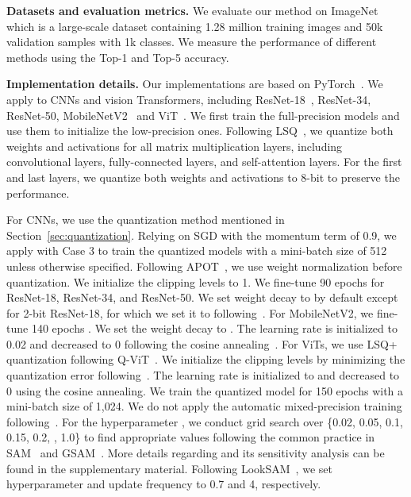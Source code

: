 \noindent\textbf{Datasets and evaluation metrics.} We evaluate our method on  ImageNet~\cite{deng2009imagenet} which is a large-scale dataset containing 1.28 million training images and 50k validation samples with 1k classes.
We measure the performance of different methods using the Top-1 and Top-5 accuracy. 

\noindent\textbf{Implementation details.}
Our implementations are based on PyTorch~\cite{paszke2019pytorch}. We apply \methodshortname to CNNs and vision Transformers, including ResNet-18~\cite{he2016deep}, ResNet-34, ResNet-50,  MobileNetV2~\cite{sandler2018inverted} and ViT~\cite{dosovitskiy2020image}. 
We first train the full-precision models and use them to initialize the low-precision ones. Following LSQ~\cite{Esser2020LEARNED}, we quantize both weights and activations for all matrix multiplication layers, including convolutional layers, fully-connected layers, and self-attention layers. For the first and last layers, we quantize both weights and activations to 8-bit to preserve the performance.  

For CNNs, we use the  quantization method mentioned in Section~\ref{sec:quantization}. Relying on SGD with the momentum term of 0.9, we apply \methodshortname with Case 3 to train the quantized models with a mini-batch size of 512 unless otherwise specified. Following APOT~\cite{Li2020Additive}, we use weight normalization before quantization. We initialize the clipping levels to 1. We fine-tune 90 epochs for ResNet-18, ResNet-34, and ResNet-50. We set weight decay to  by default except for 2-bit ResNet-18, for which we set it to  following~\cite{Esser2020LEARNED}.
For MobileNetV2, we fine-tune 140 epochs 
. We set the weight decay to .
The learning rate is initialized to 0.02 and decreased to 0 following the cosine annealing~\cite{loshchilov2016sgdr}. For ViTs, we use LSQ+~\cite{bhalgat2020lsq+}  quantization following Q-ViT~\cite{li2022q}. We initialize the clipping levels by minimizing the quantization error following~\cite{li2021fixed}.  The learning rate is initialized to  and decreased to 0 using the cosine annealing. We train the quantized model for 150 epochs with a mini-batch size of 1,024. 
We do not apply the automatic mixed-precision training following~\cite{li2022q}. For the hyperparameter , we conduct grid search over \{0.02, 0.05, 0.1, 0.15, 0.2, , 1.0\} to find appropriate values following the common practice in SAM~\cite{foret2021sharpnessaware} and GSAM~\cite{zhuang2021surrogate}. More details regarding  and its sensitivity analysis can be found in the supplementary material.
Following LookSAM~\cite{liu2022towards}, we set hyperparameter  and update frequency  to 0.7 and 4, respectively. 


